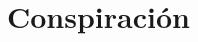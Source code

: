 \documentclass[11pt,a5paper]{book}
\begin{document}
\chapter{Conspiración}
%

\begin{appendices}
\renewcommand{\thechapter}{\arabic{chapter}}
\chapter{}
\cftchapterprecistoc{}
%
\end{appendices}
\cleardoublepage
\end{document}
